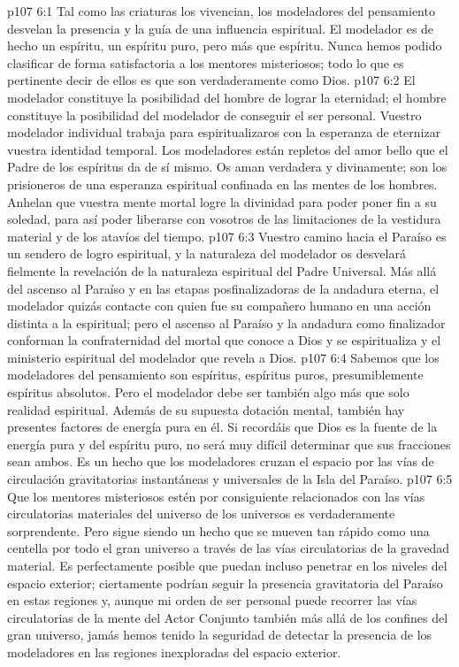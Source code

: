 \vs p107 6:1 Tal como las criaturas los vivencian, los modeladores del pensamiento desvelan la presencia y la guía de una influencia espiritual. El modelador es de hecho un espíritu, un espíritu puro, pero más que espíritu. Nunca hemos podido clasificar de forma satisfactoria a los mentores misteriosos; todo lo que es pertinente decir de ellos es que son verdaderamente como Dios.
\vs p107 6:2 El modelador constituye la posibilidad del hombre de lograr la eternidad; el hombre constituye la posibilidad del modelador de conseguir el ser personal. Vuestro modelador individual trabaja para espiritualizaros con la esperanza de eternizar vuestra identidad temporal. Los modeladores están repletos del amor bello que el Padre de los espíritus da de sí mismo. Os aman verdadera y divinamente; son los prisioneros de una esperanza espiritual confinada en las mentes de los hombres. Anhelan que vuestra mente mortal logre la divinidad para poder poner fin a su soledad, para así poder liberarse con vosotros de las limitaciones de la vestidura material y de los atavíos del tiempo.
\vs p107 6:3 Vuestro camino hacia el Paraíso es un sendero de logro espiritual, y la naturaleza del modelador os desvelará fielmente la revelación de la naturaleza espiritual del Padre Universal. Más allá del ascenso al Paraíso y en las etapas posfinalizadoras de la andadura eterna, el modelador quizás contacte con quien fue su compañero humano en una acción distinta a la espiritual; pero el ascenso al Paraíso y la andadura como finalizador conforman la confraternidad del mortal que conoce a Dios y se espiritualiza y el ministerio espiritual del modelador que revela a Dios.
\vs p107 6:4 \pc Sabemos que los modeladores del pensamiento son espíritus, espíritus puros, presumiblemente espíritus absolutos. Pero el modelador debe ser también algo más que solo realidad espiritual. Además de su supuesta dotación mental, también hay presentes factores de energía pura en él. Si recordáis que Dios es la fuente de la energía pura y del espíritu puro, no será muy difícil determinar que sus fracciones sean ambos. Es un hecho que los modeladores cruzan el espacio por las vías de circulación gravitatorias instantáneas y universales de la Isla del Paraíso.
\vs p107 6:5 Que los mentores misteriosos estén por consiguiente relacionados con las vías circulatorias materiales del universo de los universos es verdaderamente sorprendente. Pero sigue siendo un hecho que se mueven tan rápido como una centella por todo el gran universo a través de las vías circulatorias de la gravedad material. Es perfectamente posible que puedan incluso penetrar en los niveles del espacio exterior; ciertamente podrían seguir la presencia gravitatoria del Paraíso en estas regiones y, aunque mi orden de ser personal puede recorrer las vías circulatorias de la mente del Actor Conjunto también más allá de los confines del gran universo, jamás hemos tenido la seguridad de detectar la presencia de los modeladores en las regiones inexploradas del espacio exterior.

